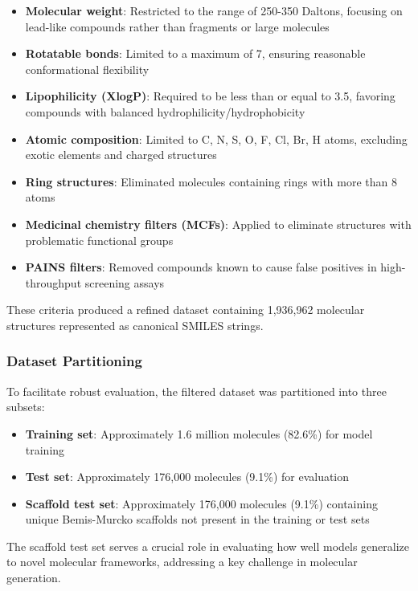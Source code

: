 \documentclass[conference]{IEEEtran}
\begin{document}
\begin{itemize}
    \item \textbf{Molecular weight}: Restricted to the range of 250-350 Daltons, focusing on lead-like compounds rather than fragments or large molecules
    \item \textbf{Rotatable bonds}: Limited to a maximum of 7, ensuring reasonable conformational flexibility
    \item \textbf{Lipophilicity (XlogP)}: Required to be less than or equal to 3.5, favoring compounds with balanced hydrophilicity/hydrophobicity
    \item \textbf{Atomic composition}: Limited to C, N, S, O, F, Cl, Br, H atoms, excluding exotic elements and charged structures
    \item \textbf{Ring structures}: Eliminated molecules containing rings with more than 8 atoms
    \item \textbf{Medicinal chemistry filters (MCFs)}: Applied to eliminate structures with problematic functional groups
    \item \textbf{PAINS filters}: Removed compounds known to cause false positives in high-throughput screening assays \cite{Baell2010}
\end{itemize}

These criteria produced a refined dataset containing 1,936,962 molecular structures represented as canonical SMILES strings.

\subsubsection{Dataset Partitioning}
To facilitate robust evaluation, the filtered dataset was partitioned into three subsets:

\begin{itemize}
    \item \textbf{Training set}: Approximately 1.6 million molecules (82.6\%) for model training
    \item \textbf{Test set}: Approximately 176,000 molecules (9.1\%) for evaluation
    \item \textbf{Scaffold test set}: Approximately 176,000 molecules (9.1\%) containing unique Bemis-Murcko scaffolds \cite{Bemis1996} not present in the training or test sets
\end{itemize}

The scaffold test set serves a crucial role in evaluating how well models generalize to novel molecular frameworks, addressing a key challenge in molecular generation.
\end{document}
